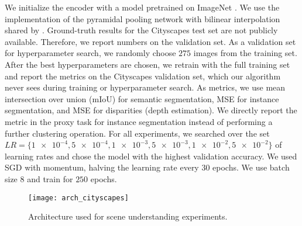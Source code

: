 We initialize the encoder with a model pretrained on ImageNet \citep{imagenet}. We use the implementation of the pyramidal pooling network with bilinear interpolation shared by \citet{pspnet_implementation}. Ground-truth results for the Cityscapes test set are not publicly available. Therefore, we report numbers on the validation set. As a validation set for hyperparameter search, we randomly choose $275$ images from the training set. After the best hyperparameters are chosen, we retrain with the full training set and report the metrics on the Cityscapes validation set, which our algorithm never sees during training or hyperparameter search. As metrics, we use mean intersection over union (mIoU) for semantic segmentation, MSE for instance segmentation, and MSE for disparities (depth estimation). We directly report the metric in the proxy task for instance segmentation instead of performing a further clustering operation. For all experiments, we searched over the set $LR=\{\num{1e-4}, \num{5e-4}, \num{1e-3}, \num{5e-3}, \num{1e-2}, \num{5e-2}\}$ of learning rates and chose the model with the highest validation accuracy. We used SGD with momentum, halving the learning rate every 30 epochs. We use batch size $8$ and train for $250$ epochs.

\begin{figure}[ht]
\texttt{[image: arch\_cityscapes]}
\caption{Architecture used for scene understanding experiments.}
\label{fig:scene}
\end{figure}
